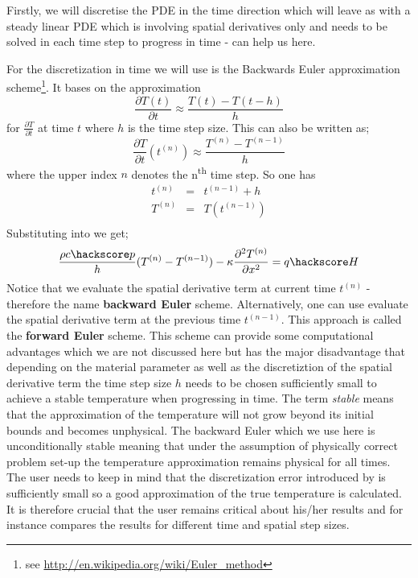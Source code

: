 Firstly, we will discretise the PDE  in the time direction which will
leave as with a steady linear PDE which is involving spatial derivatives only and needs to be solved in each time 
step to progress in time - \esc can help us here.

For the discretization in time we will use is the Backwards Euler approximation scheme\footnote{see \url{http://en.wikipedia.org/wiki/Euler_method}}. It bases on the
approximation 
\begin{equation}
\frac{\partial T(t)}{\partial t} \approx \frac{T(t)-T(t-h)}{h}
\label{eqn:beuler}
\end{equation}
for  $\frac{\partial T}{\partial t}$  at time $t$ 
where $h$ is the time step size. This can also be written as;
\begin{equation}
\frac{\partial T}{\partial t}(t^{(n)}) \approx \frac{T^{(n)} - T^{(n-1)}}{h}
\label{eqn:Tbeuler}
\end{equation}
where the upper index $n$ denotes the n\textsuperscript{th} time step. So one has
\begin{equation}
\begin{array}{rcl}
t^{(n)} & = & t^{(n-1)}+h \\
T^{(n)} & = & T(t^{(n-1)}) \\ 
\end{array}
\label{eqn:Neuler}
\end{equation}
Substituting  into  we get;
\begin{equation}
\frac{\rho c\hackscore p}{h} (T^{(n)} - T^{(n-1)}) - \kappa \frac{\partial^{2} T^{(n)}}{\partial x^{2}} = q\hackscore H 
\label{eqn:hddisc}
\end{equation}
Notice that we evaluate the spatial derivative term at current time $t^{(n)}$ - therefore the name \textbf{backward Euler} scheme. Alternatively, one can use evaluate the spatial derivative term at the previous time $t^{(n-1)}$. This 
approach is called the \textbf{forward Euler} scheme. This scheme can provide some computational advantages which
we are not discussed here but has the major disadvantage that depending on the 
material parameter as well as the discretiztion of the spatial derivative term the time step size $h$ needs to be chosen sufficiently small to achieve a stable temperature when progressing in time. The term \textit{stable} means
that the approximation of the temperature will not grow beyond its initial bounds and becomes unphysical. 
The backward Euler which we use here is unconditionally stable meaning that under the assumption of
physically correct problem set-up the temperature approximation remains physical for all times. 
The user needs to keep in mind that the discretization error introduced by  
is sufficiently small so a good approximation of the true temperature is calculated. It is
therefore crucial that the user remains critical about his/her results and for instance compares 
the results for different time and spatial step sizes. 

